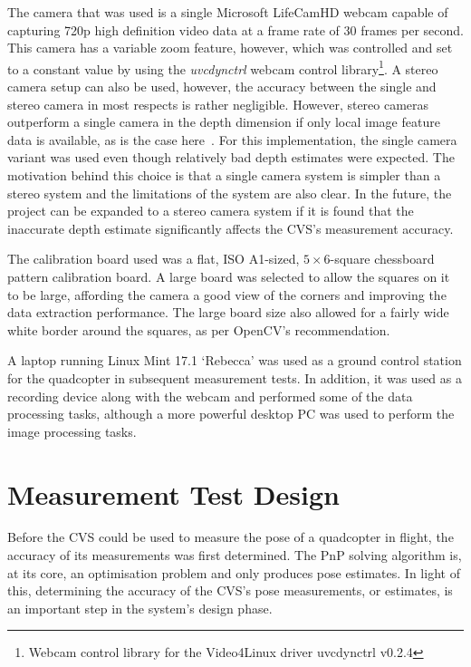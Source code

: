 The camera that was used is a single Microsoft LifeCamHD webcam capable of capturing 720p high definition video data at a frame rate of 30 frames per second. This camera has a variable zoom feature, however, which was controlled and set to a constant value by using the \emph{uvcdynctrl} webcam control library\footnote{Webcam control library for the Video4Linux driver uvcdynctrl v0.2.4}. A stereo camera setup can also be used, however, the accuracy between the single and stereo camera in most respects is rather negligible. However, stereo cameras outperform a single camera in the depth dimension if only local image feature data is available, as is the case here~\citep{saxena20083}.  For this implementation, the single camera variant was used even though relatively bad depth estimates were expected. The motivation behind this choice is that a single camera system is simpler than a stereo system and the limitations of the system are also clear. In the future, the project can be expanded to a stereo camera system if it is found that the inaccurate depth estimate significantly affects the CVS's measurement accuracy.

The calibration board used was a flat, ISO A1-sized, $5\times6$-square chessboard pattern calibration board. A large board was selected to allow the squares on it to be large, affording the camera a good view of the corners and improving the data extraction performance. The large board size also allowed for a fairly wide white border around the squares, as per OpenCV's recommendation. 

A laptop running Linux Mint 17.1 `Rebecca' was used as a ground control station for the quadcopter in subsequent measurement tests. In addition, it was used as a recording device along with the webcam and performed some of the data processing tasks, although a more powerful desktop PC was used to perform the image processing tasks. 

\section{Measurement Test Design}

Before the CVS could be used to measure the pose of a quadcopter in flight, the accuracy of its measurements was first determined. The PnP solving algorithm is, at its core, an optimisation problem and only produces pose estimates. In light of this, determining the accuracy of the CVS's pose measurements, or estimates, is an important step in the system's design phase. 

